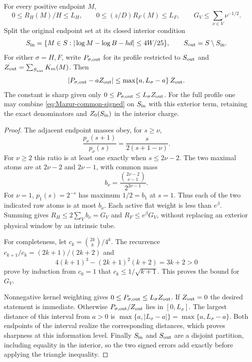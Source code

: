 \begin{proposition}
\label{prop:Mazur-profile-envelope}
For every positive endpoint $M$,
\[
 0\le R_H(M)/H\le L_H,\qquad
 0\le(z/D)R_F(M)\le L_F,\qquad
 G_V\le\sum_{\nu\in V}\nu^{-1/2}.
\]
Split the original endpoint set at its closed interior condition
\[
 S_{\rm in}=\{M\in S:
  |\log M-\log B-hd|\le4W/25\},\qquad
 S_{\rm out}=S\setminus S_{\rm in}.
\]
For either $\sigma=H,F$, write $P_{\sigma,\rm out}$ for its
profile restricted to $S_{\rm out}$ and
$Z_{\rm out}=\sum_{S_{\rm out}}K_m(M)$. Then
\begin{equation}
 |P_{\sigma,\rm out}-aZ_{\rm out}|
 \le\max\{a,L_\sigma-a\}\,Z_{\rm out}.
 \label{eq:Mazur-sharp-exterior}
\end{equation}
The constant is sharp given only $0\le P_{\sigma,\rm out}
\le L_\sigma Z_{\rm out}$.
For the full profile one may combine
\eqref{eq:Mazur-common-signed} on $S_{\rm in}$ with this
exterior term, retaining the exact denominators and
$Z_0(S_{\rm in})$ in the interior charge.
\end{proposition}
\begin{proof}
The adjacent endpoint masses obey, for $s\ge\nu$,
\[
 \frac{p_\nu(s+1)}{p_\nu(s)}
      =\frac{s}{2(s+1-\nu)}.
\]
For $\nu\ge2$ this ratio is at least one exactly when
$s\le2\nu-2$. The two maximal atoms are at $2\nu-2$ and
$2\nu-1$, with common mass
\[
 b_\nu=\frac{\binom{2\nu-2}{\nu-1}}{2^{2\nu-1}}.
\]
For $\nu=1$, $p_1(s)=2^{-s}$ has maximum $1/2=b_1$
at $s=1$. Thus each of the two indicated raw atoms is at most
$b_\nu$. Each active flat weight is less than $e^\beta$.
Summing gives $R_H\le2\sum_Vb_\nu=G_V$ and
$R_F\le e^\beta G_V$, without replacing an exterior physical
window by an intrinsic tube.

For completeness, let $c_k=\binom{2k}{k}/4^k$.
The recurrence $c_{k+1}/c_k=(2k+1)/(2k+2)$ and
\[
 4(k+1)^3-(2k+1)^2(k+2)=3k+2>0
\]
prove by induction from $c_0=1$ that
$c_k\le1/\sqrt{k+1}$. This proves the bound for $G_V$.

Nonnegative kernel weighting gives
$0\le P_{\sigma,\rm out}\le L_\sigma Z_{\rm out}$.
If $Z_{\rm out}=0$ the desired statement is immediate.
Otherwise $P_{\sigma,\rm out}/Z_{\rm out}$ lies in $[0,L_\sigma]$.
The largest distance of this interval from $a>0$ is
$\max\{a,|L_\sigma-a|\}=\max\{a,L_\sigma-a\}$.
Both endpoints of the interval realize the corresponding distances,
which proves sharpness at this information level.
Finally $S_{\rm in}$ and $S_{\rm out}$ are a disjoint partition,
including equality in the interior, so the two signed errors add
exactly before applying the triangle inequality.
\end{proof}

